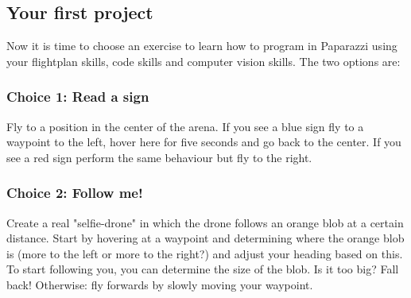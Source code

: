 \documentclass{article}
\begin{document}
\subsection*{Your first project}
Now it is time to choose an exercise to learn how to program in Paparazzi using your flightplan skills, code skills and computer vision skills. The two options are:

\subsubsection*{Choice 1: Read a sign}
Fly to a position in the center of the arena. If you see a blue sign fly to a waypoint to the left, hover here for five seconds and go back to the center. If you see a red sign perform the same behaviour but fly to the right. 

\subsubsection*{Choice 2: Follow me!}
Create a real "selfie-drone" in which the drone follows an orange blob at a certain distance. 
Start by hovering at a waypoint and determining where the orange blob is (more to the left or more to the right?) and adjust your heading based on this. 
To start following you, you can determine the size of the blob. Is it too big? Fall back! Otherwise: fly forwards by slowly moving your waypoint.
\end{document}
